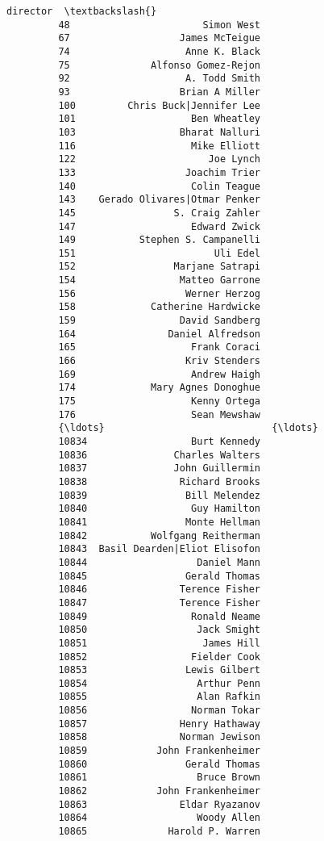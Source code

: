 \documentclass[11pt]{article}
\begin{document}
\begin{Verbatim}[commandchars=\\\{\}]
                                    director  \textbackslash{}
         48                       Simon West   
         67                   James McTeigue   
         74                    Anne K. Black   
         75              Alfonso Gomez-Rejon   
         92                    A. Todd Smith   
         93                   Brian A Miller   
         100         Chris Buck|Jennifer Lee   
         101                    Ben Wheatley   
         103                  Bharat Nalluri   
         116                    Mike Elliott   
         122                       Joe Lynch   
         133                   Joachim Trier   
         140                    Colin Teague   
         143    Gerado Olivares|Otmar Penker   
         145                 S. Craig Zahler   
         147                    Edward Zwick   
         149           Stephen S. Campanelli   
         151                        Uli Edel   
         152                 Marjane Satrapi   
         154                  Matteo Garrone   
         156                   Werner Herzog   
         158             Catherine Hardwicke   
         159                  David Sandberg   
         164                Daniel Alfredson   
         165                    Frank Coraci   
         166                   Kriv Stenders   
         169                    Andrew Haigh   
         174             Mary Agnes Donoghue   
         175                    Kenny Ortega   
         176                    Sean Mewshaw   
         {\ldots}                             {\ldots}   
         10834                  Burt Kennedy   
         10836               Charles Walters   
         10837               John Guillermin   
         10838                Richard Brooks   
         10839                 Bill Melendez   
         10840                  Guy Hamilton   
         10841                 Monte Hellman   
         10842           Wolfgang Reitherman   
         10843  Basil Dearden|Eliot Elisofon   
         10844                   Daniel Mann   
         10845                 Gerald Thomas   
         10846                Terence Fisher   
         10847                Terence Fisher   
         10849                  Ronald Neame   
         10850                   Jack Smight   
         10851                    James Hill   
         10852                  Fielder Cook   
         10853                 Lewis Gilbert   
         10854                   Arthur Penn   
         10855                   Alan Rafkin   
         10856                  Norman Tokar   
         10857                Henry Hathaway   
         10858                Norman Jewison   
         10859            John Frankenheimer   
         10860                 Gerald Thomas   
         10861                   Bruce Brown   
         10862            John Frankenheimer   
         10863                Eldar Ryazanov   
         10864                   Woody Allen   
         10865              Harold P. Warren   
         

\end{Verbatim}
\end{document}
